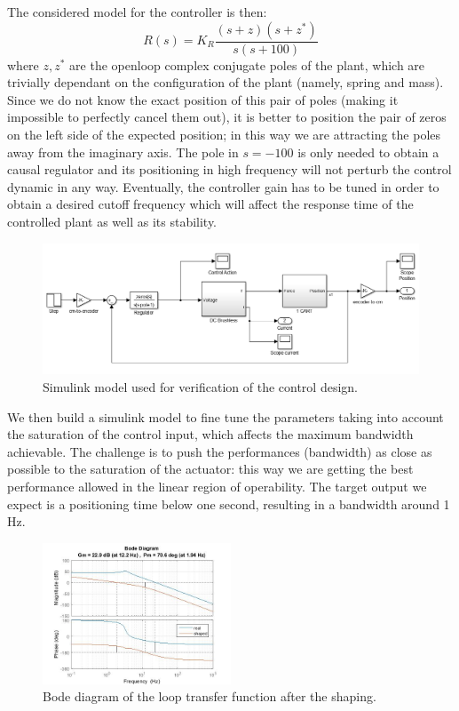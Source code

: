 The considered model for the controller is then:
\begin{equation}
R(s) = K_R\frac{(s+z)(s+z^*)}{s(s+100)}
\end{equation}
where $z,z^*$ are the openloop complex conjugate poles of the plant, which are trivially dependant on the configuration of the plant (namely, spring and mass). Since we do not know the exact position of this pair of poles (making it impossible to perfectly cancel them out), it is better to position the pair of zeros on the left side of the expected position; in this way we are attracting the poles away from the imaginary axis. The pole in $s=-100$ is only needed to obtain a causal regulator and its positioning in high frequency will not perturb the control dynamic in any way. Eventually, the controller gain has to be tuned in order to obtain a desired cutoff frequency which will affect the response time of the controlled plant as well as its stability. \\

\begin{figure}
\centering
\includegraphics[width=\textwidth]{img/ls_simulink.png}
\caption{Simulink model used for verification of the control design.}
\end{figure}

We then build a simulink model to fine tune the parameters taking into account the saturation of the control input, which affects the maximum bandwidth achievable. The challenge is to push the performances (bandwidth) as close as possible to the saturation of the actuator: this way we are getting the best performance allowed in the linear region of operability. The target output we expect is a positioning time below one second, resulting in a bandwidth around 1 Hz.\\

\begin{figure}[h]
\centering
\includegraphics[width=0.5\textwidth]{img/ls_bode_shaping.jpg}
\caption{Bode diagram of the loop transfer function after the shaping.}
\end{figure}

